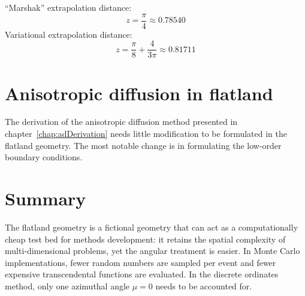 \clearpage

``Marshak'' extrapolation distance:
\begin{equation*}
  z = \frac{\pi}{4} \approx 0.78540
\end{equation*}
Variational extrapolation distance:
\begin{equation*}
  z = \frac{\pi}{8} + \frac{4}{3\pi} \approx 0.81711
\end{equation*}

\section{Anisotropic diffusion in flatland}
The derivation of the anisotropic diffusion method presented in
chapter~\ref{chap:adDerivation} needs little modification to be formulated
in the flatland geometry. The most notable change is in formulating the
low-order boundary conditions.


\section{Summary}
The flatland geometry is a fictional geometry that can act as a computationally
cheap test bed for methods development: it retains the spatial complexity of
multi-dimensional problems, yet the angular treatment is easier. In Monte Carlo
implementations, fewer random numbers are sampled per event and fewer expensive
transcendental functions are evaluated. In the discrete ordinates method, only
one azimuthal angle $\mu=0$ needs to be accounted for.

